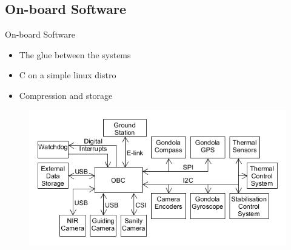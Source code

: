 \documentclass[11pt, aspectratio=169]{beamer}
\begin{document}
\subsection{On-board Software} 	%
\begin{frame}{On-board Software}
\begin{itemize}
	\item The glue between the systems
	\item C on a simple linux distro
	\item Compression and storage
\end{itemize}
\begin{figure}
	\includegraphics[scale=0.4]{figures/images/process-overview.png}
\end{figure}
\end{frame}
\end{document}
